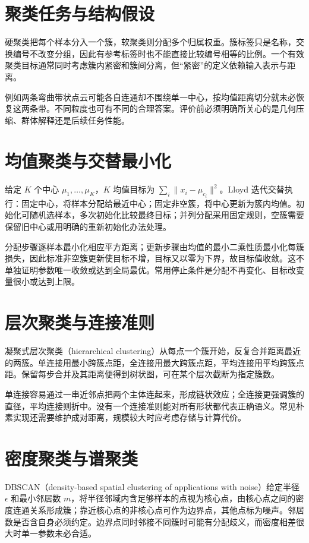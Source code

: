 \documentclass[UTF8,12pt,a4paper,fontset=fandol]{ctexbook}
\begin{document}
\section{聚类任务与结构假设}

硬聚类把每个样本分入一个簇，软聚类则分配多个归属权重。簇标签只是名称，交换编号不改变分组，因此有参考标签时也不能直接比较编号相等的比例。一个有效聚类目标通常同时考虑簇内紧密和簇间分离，但“紧密”的定义依赖输入表示与距离。

例如两条弯曲带状点云可能各自连通却不围绕单一中心，按均值距离切分就未必恢复这两条带。不同粒度也可有不同的合理答案。评价前必须明确所关心的是几何压缩、群体解释还是后续任务性能。

\section{均值聚类与交替最小化}

给定 $K$ 个中心 $\mu_1,\ldots,\mu_K$，$K$ 均值目标为 $\sum_i\|x_i-\mu_{c_i}\|^2$。Lloyd 迭代交替执行：固定中心，将样本分配给最近中心；固定非空簇，将中心更新为簇内均值。初始化可随机选样本，多次初始化比较最终目标；并列分配采用固定规则，空簇需要保留旧中心或用明确的重新初始化办法处理。

分配步骤逐样本最小化相应平方距离；更新步骤由均值的最小二乘性质最小化每簇损失，因此标准非空簇更新使目标不增，目标又以零为下界，故目标值收敛。这不单独证明参数唯一收敛或达到全局最优。常用停止条件是分配不再变化、目标改变量很小或达到上限。

\section{层次聚类与连接准则}

凝聚式层次聚类（hierarchical clustering）从每点一个簇开始，反复合并距离最近的两簇。单连接用最小跨簇点距，全连接用最大跨簇点距，平均连接用平均跨簇点距。保留每步合并及其距离便得到树状图，可在某个层次截断为指定簇数。

单连接容易通过一串近邻点把两个主体连起来，形成链状效应；全连接更强调簇的直径，平均连接则折中。没有一个连接准则能对所有形状都代表正确语义。常见朴素实现还需要维护成对距离，规模较大时应考虑存储与计算代价。

\section{密度聚类与谱聚类}

DBSCAN（density-based spatial clustering of applications with noise）给定半径 $\epsilon$ 和最小邻居数 $m$，将半径邻域内含足够样本的点视为核心点，由核心点之间的密度连通关系形成簇；靠近核心点的非核心点可作为边界点，其他点标为噪声。邻居数是否含自身必须约定。边界点同时邻接不同簇时可能有分配歧义，而密度相差很大时单一参数未必合适。
\end{document}
